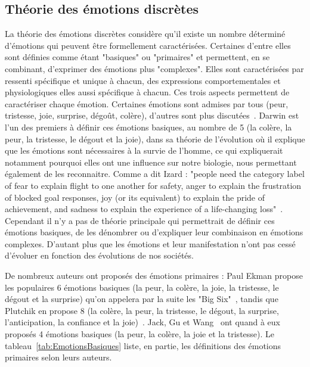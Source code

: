 \subsection{Théorie des émotions discrètes}
La théorie des émotions discrètes considère qu'il existe un nombre déterminé d'émotions qui peuvent être formellement caractérisées. Certaines d'entre elles sont définies comme étant "basiques" ou "primaires" et permettent, en se combinant, d'exprimer des émotions plus "complexes". Elles sont caractérisées par ressenti spécifique et unique à chacun, des expressions comportementales et physiologiques elles aussi spécifique à chacun. Ces trois aspects permettent de caractériser chaque émotion. Certaines émotions sont admises par tous (peur, tristesse, joie, surprise, dégoût, colère), d'autres sont plus discutées~\cite{Cosnier1994}.
Darwin est l'un des premiers à définir ces émotions basiques, au nombre de 5 (la colère, la peur, la tristesse, le dégout et la joie), dans sa théorie de l'évolution où il explique que les émotions sont nécessaires à la survie de l'homme, ce qui expliquerait notamment pourquoi elles ont une influence sur notre biologie, nous permettant également de les reconnaitre.
Comme a dit Izard : "people need the category label of fear to explain flight to one another for safety, anger to explain the frustration of blocked goal responses, joy (or its equivalent) to explain the pride of achievement, and sadness to explain the experience of a life-changing loss"~\cite{Izard2007}.
Cependant il n'y a pas de théorie principale qui permettrait de définir ces émotions basiques, de les dénombrer ou d'expliquer leur combinaison en émotions complexes. D'autant plus que les émotions et leur manifestation n'ont pas cessé d'évoluer en fonction des évolutions de nos sociétés.



De nombreux auteurs ont proposés des émotions primaires : Paul Ekman propose les populaires 6 émotions basiques (la peur, la colère, la joie, la tristesse, le dégout et la surprise) qu'on appelera par la suite les "Big Six"~\cite{Ekman1999}, tandis que Plutchik en propose 8 (la colère, la peur, la tristesse, le dégout, la surprise, l'anticipation, la confiance et la joie)~\cite{Plutchik1980}. Jack, Gu et Wang~\cite{Jack2016,Gu2015,Wang2016} ont quand à eux proposés 4 émotions basiques (la peur, la colère, la joie et la tristesse). Le tableau~\ref{tab:EmotionsBasiques} liste, en partie, les définitions des émotions primaires selon leurs auteurs.

